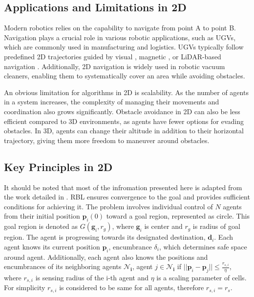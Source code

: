     \subsection{Applications and Limitations in 2D}
        Modern robotics relies on the capability to navigate from point A to point B.
        Navigation plays a crucial role in various robotic applications, such as \ac{UGV}s, which are commonly used in manufacturing and logistics. 
        \ac{UGV}s typically follow predefined 2D trajectories guided by visual \cite{vision_navigation}, magnetic \cite{magnetic_navigation}, or LiDAR-based navigation \cite{lidar_navigation}. 
        Additionally, 2D navigation is widely used in robotic vacuum cleaners, enabling them to systematically cover an area while avoiding obstacles.

        An obvious limitation for algorithms in 2D is scalability. 
        As the number of agents in a system increases, the complexity of managing their movements and coordination also grows significantly.
        Obstacle avoidance in 2D can also be less efficient compared to 3D environments, as agents have fewer options for evading obstacles. 
        In 3D, agents can change their altitude in addition to their horizontal trajectory, giving them more freedom to maneuver around obstacles.

    \subsection{Key Principles in 2D}
        It should be noted that most of the infromation presented here is adapted from the work detailed in \cite{rbl_paper}.
        RBL ensures convergence to the goal and provides sufficient conditions for achieving it. 
        The problem involves individual control of $N$ agents from their initial position $\mathbf{p}_i(0)$ toward a goal region, represented as circle.
        This goal region is denoted as $G(\mathbf{g}_i, r_g)$, where $\mathbf{g}_i$ is center and $r_g$ is radius of goal region. 
        The agent is progressing towards its designated destination, $\mathbf{d}_i$.
        Each agent knows its current position $\mathbf{p}_i$, encumbrance $\delta_i$, which determines safe space around agent.
        Additionally, each agent also knows the positions and encumbrances of its neighboring agents $\mathbf{\mathcal{N}_i}$, agent $j \in \mathbf{\mathcal{N}_i}$ if $||\mathbf{p}_i - \mathbf{p}_j|| \leq \frac{r_{s,i}}{\eta}$, where $r_{s,i}$ is sensing radius of the i-th agent and $\eta$ is a scaling parameter of cells.
        For simplicity $r_{s,i}$ is considered to be same for all agents, therefore $r_{s,i} = r_s$. 

